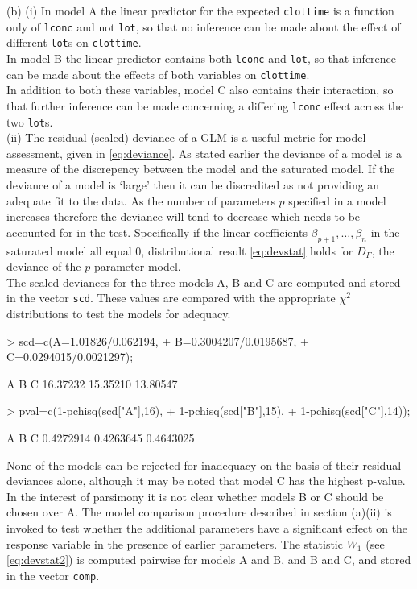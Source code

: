\documentclass[a4paper,11pt]{article}
\begin{document}
(b)
(i) In model A the linear predictor for the expected \texttt{clottime} is a function only of \texttt{lconc} and not \texttt{lot}, so that no inference can be made about the effect of different \texttt{lot}s on \texttt{clottime}.\\
In model B the linear predictor contains both \texttt{lconc} and \texttt{lot}, so that inference can be made about the effects of both variables on \texttt{clottime}.\\
In addition to both these variables, model C also contains their interaction, so that further inference can be made concerning a differing \texttt{lconc} effect across the two \texttt{lot}s.\\

(ii) The residual (scaled) deviance of a GLM is a useful metric for model assessment, given in \eqref{eq:deviance}. As stated earlier the deviance of a model is a measure of the discrepency between the model and the saturated model. If the deviance of a model is `large' then it can be discredited as not providing an adequate fit to the data. As the number of parameters $p$ specified in a model increases therefore the deviance will tend to decrease which needs to be accounted for in the test. Specifically if the linear coefficients $\beta_{p+1},\dots,\beta_{n}$ in the saturated model all equal 0, distributional result \eqref{eq:devstat} holds for $D_F$, the deviance of the $p$-parameter model.\\
The scaled deviances for the three models A, B and C are computed and stored in the vector \texttt{scd}. These values are compared with the appropriate $\chi^2$ distributions to test the models for adequacy.
\begin{Schunk}
\begin{Sinput}
> scd=c(A=1.01826/0.062194,
+       B=0.3004207/0.0195687,
+       C=0.0294015/0.0021297);
\end{Sinput}
\begin{Soutput}
       A        B        C 
16.37232 15.35210 13.80547 
\end{Soutput}
\begin{Sinput}
> pval=c(1-pchisq(scd["A"],16),
+        1-pchisq(scd["B"],15),
+        1-pchisq(scd["C"],14));
\end{Sinput}
\begin{Soutput}
        A         B         C 
0.4272914 0.4263645 0.4643025 
\end{Soutput}
\end{Schunk}
None of the models can be rejected for inadequacy on the basis of their residual deviances alone, although it may be noted that model C has the highest p-value. In the interest of parsimony it is not clear whether models B or C should be chosen over A. The model comparison procedure described in section (a)(ii) is invoked to test whether the additional parameters have a significant effect on the response variable in the presence of earlier parameters. The statistic $W_1$ (see \eqref{eq:devstat2}) is computed pairwise for models A and B, and B and C, and stored in the vector \texttt{comp}.
\end{document}
